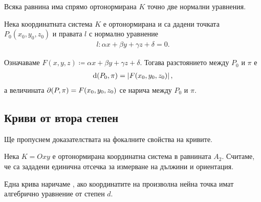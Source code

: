 \documentclass[numbers=endperiod, bibliography=totocnumbered]{scrartcl}
\begin{document}
\begin{proposition}
  Всяка равнина има спрямо ортонормирана \( K \) точно две нормални уравнения.
\end{proposition}

\begin{theorem}
  Нека координатната система \( K \) е ортонормирана и са дадени точката \( P_0(x_0, y_0, z_0) \) и правата \( l \) с нормално уравнение
  \begin{align*}
    l: \alpha x + \beta y + \gamma z + \delta = 0.
  \end{align*}

  Означаваме \( F(x, y, z) \coloneqq \alpha x + \beta y + \gamma z + \delta \). Тогава разстоянието между \( P_0 \) и \( \pi \) е
  \begin{align*}
    \operatorname{d}(P_0, \pi) = \left\vert F(x_0, y_0, z_0) \right\vert,
  \end{align*}
  а величината \( \partial(P, \pi) = F(x_0, y_0, z_0) \) се нарича  между \( P_0 \) и \( \pi \).
\end{theorem}

\subsection{Криви от втора степен}

\begin{note}
  Ще пропуснем доказателствата на фокалните свойства на кривите.
\end{note}

Нека \( K = Oxy \) е ортонормирана координатна система в равнината \( A_2 \). Считаме, че са зададени единична отсечка за измерване на дължини и ориентация.

\begin{definition}
  Една крива наричаме , ако координатите на произволна нейна точка имат алгебрично уравнение от степен \( d \).
\end{definition}
\end{document}

